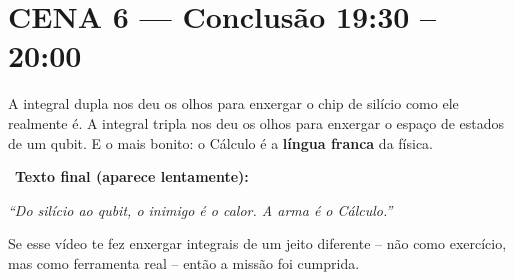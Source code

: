 \section{CENA 6 --- Conclusão \hfill \normalfont\small\color{corTempo}19:30 -- 20:00}

\begin{fala}
A integral dupla nos deu os olhos para enxergar o chip de silício como ele
realmente é. A integral tripla nos deu os olhos para enxergar o espaço 
de estados de um qubit. E o mais bonito: o Cálculo é a \textbf{língua franca} da física.
\end{fala}

\begin{tela}
\faDesktop\ \textbf{Texto final (aparece lentamente):}
\begin{center}
\large\itshape
``Do silício ao qubit, o inimigo é o calor. A arma é o Cálculo.''
\end{center}
\end{tela}

\begin{fala}
Se esse vídeo te fez enxergar integrais de um jeito diferente --
não como exercício, mas como ferramenta real -- então a missão foi cumprida.
\end{fala}